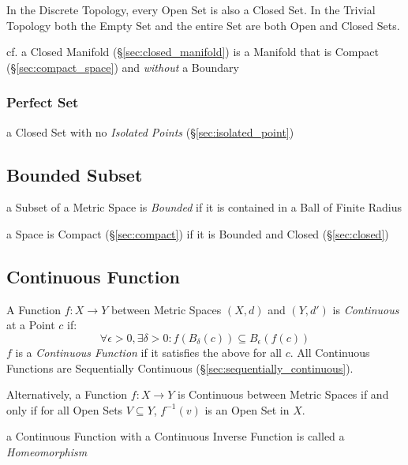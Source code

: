 In the Discrete Topology, every Open Set is also a Closed Set. In the
Trivial Topology both the Empty Set and the entire Set are both Open
and Closed Sets.

\fist cf. a Closed Manifold (\S\ref{sec:closed_manifold}) is a Manifold that is
Compact (\S\ref{sec:compact_space}) and \emph{without} a Boundary



\subsubsection{Perfect Set}\label{sec:perfect_set}

a Closed Set with no \emph{Isolated Points}
(\S\ref{sec:isolated_point})



\subsection{Bounded Subset}\label{sec:bounded_subset}

a Subset of a Metric Space is \emph{Bounded} if it is contained in a Ball of
Finite Radius

a Space is Compact (\S\ref{sec:compact}) if it is Bounded and Closed
(\S\ref{sec:closed})



\subsection{Continuous Function}\label{sec:continuous_function}

A Function $f : X \rightarrow Y$ between Metric Spaces $(X,d)$ and
$(Y,d')$ is \emph{Continuous} at a Point $c$ if:
\[
  \forall \epsilon > 0, \exists \delta > 0 :
  f (B_{\delta}(c)) \subseteq B_{\epsilon}(f(c))
\]
$f$ is a \emph{Continuous Function} if it satisfies the above for all
$c$. All Continuous Functions are Sequentially Continuous
(\S\ref{sec:sequentially_continuous}).

Alternatively, a Function $f: X \rightarrow Y$ is Continuous between
Metric Spaces if and only if for all Open Sets $V \subseteq Y$,
$f^{-1}(v)$ is an Open Set in $X$.

a Continuous Function with a Continuous Inverse Function is called a
\emph{Homeomorphism}


